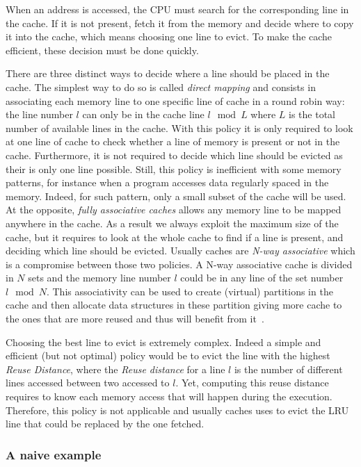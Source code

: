 When an address is accessed, the \gls{CPU} must search for the corresponding line in the cache.
If it is not present, fetch it from the memory and decide where to copy it into the cache, which means choosing one line to evict.
To make the cache efficient, these decision must be done quickly.

There are three distinct ways to decide where a line should be placed in the cache.
The simplest way to do so is called \emph{direct mapping} and consists in associating each memory line to one specific line of cache in a round robin way: the line number $l$ can only be in the cache line $l \mod L$ where $L$ is the total number of available lines in the cache.
With this policy it is only required to look at one line of cache to check whether a line of memory is present or not in the cache.
Furthermore, it is not required to decide which line should be evicted as their is only one line possible.
Still, this policy is inefficient with some memory patterns, for instance when a program accesses data regularly spaced in the memory.
Indeed, for such pattern, only a small subset of the cache will be used.
At the opposite, \emph{fully associative caches} allows any memory line to be mapped anywhere in the cache.
As a result we always exploit the maximum size of the cache, but it requires to look at the whole cache to find if a line is present, and deciding which line should be evicted.
Usually caches are \emph{N-way associative} which is a compromise between those two policies.
A N-way associative cache is divided in $N$ sets and the memory line number $l$ could be in any line of the set number $l \mod N$.
This associativity can be used to create (virtual) partitions in the cache and then allocate data structures in these partition giving more cache to the ones that are more reused and thus will benefit from it~\cite{Perarnau11Controlling}.

Choosing the best line to evict is extremely complex.
Indeed a simple and efficient (but not optimal) policy would be to evict the line with the highest \emph{Reuse Distance}, where the \emph{Reuse distance} for a line $l$ is the number of different lines accessed between two accessed to $l$.
Yet, computing this reuse distance requires to know each memory access that will happen during the execution.
Therefore, this policy is not applicable and usually caches uses to evict the \gls{LRU} line that could be replaced by the one fetched.

\subsubsection{A naive example}

